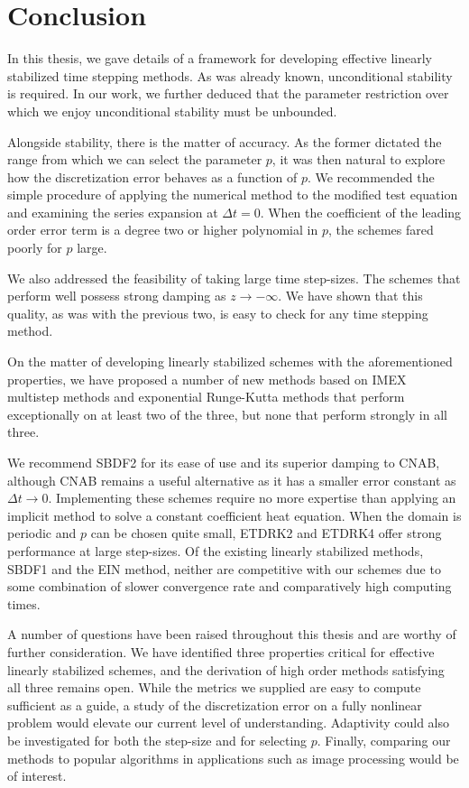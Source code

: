 \chapter{Conclusion}
In this thesis, we gave details of a framework for developing effective linearly stabilized time stepping methods. As was already known, unconditional stability is required. In our work, we further deduced that the parameter restriction over which we enjoy unconditional stability must be unbounded. 

Alongside stability, there is the matter of accuracy. As the former dictated the range from which we can select the parameter $p$, it was then natural to explore how the discretization error behaves as a function of $p$. We recommended the simple procedure of applying the numerical method to the modified test equation and examining the series expansion at $\Delta t = 0$. When the coefficient of the leading order error term is a degree two or higher polynomial in $p$, the schemes fared poorly for $p$ large.

We also addressed the feasibility of taking large time step-sizes. The schemes that perform well possess strong damping as $z\to-\infty$. We have shown that this quality, as was with the previous two, is easy to check for any time stepping method.

On the matter of developing linearly stabilized schemes with the aforementioned properties, we have proposed a number of new methods based on IMEX multistep methods and exponential Runge-Kutta methods that perform exceptionally on at least two of the three, but none that perform strongly in all three.

We recommend SBDF2 for its ease of use and its superior damping to CNAB, although CNAB remains a useful alternative as it has a smaller error constant as $\Delta t \to 0$. Implementing these schemes require no more expertise than applying an implicit method to solve a constant coefficient heat equation. 
When the domain is periodic and  $p$ can be chosen quite small, ETDRK2 and ETDRK4 offer strong performance at large step-sizes.
Of the existing linearly stabilized methods, SBDF1 and the EIN method, neither are competitive with our schemes due to some combination of slower convergence rate and comparatively high computing times.

A number of questions have been raised throughout this thesis and are worthy of further consideration. We have identified three properties critical for effective linearly stabilized schemes, and the derivation of high order methods satisfying all three remains open. While the metrics we supplied are easy to compute sufficient as a guide, a study of the discretization error on a fully nonlinear problem would elevate our current level of understanding. Adaptivity could also be investigated for both the step-size and for selecting $p$. Finally, comparing our methods to popular algorithms in applications such as image processing would be of interest.
